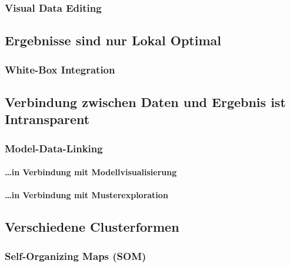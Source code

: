             \subsubsection{Visual Data Editing} %

        \subsection{Ergebnisse sind nur Lokal Optimal} %

            \subsubsection{White-Box Integration} %

        \subsection{Verbindung zwischen Daten und Ergebnis ist Intransparent} %

            \subsubsection{Model-Data-Linking} %

                \paragraph{\dots in Verbindung mit Modellvisualisierung} %

                \paragraph{\dots in Verbindung mit Musterexploration} %

        \subsection{Verschiedene Clusterformen} %

            \subsubsection{Self-Organizing Maps (SOM)} %

